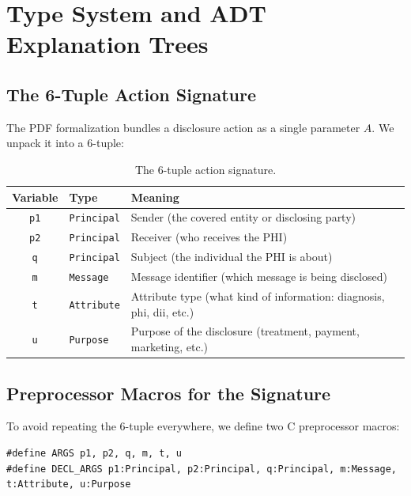 \documentclass[11pt,letterpaper]{article}
\begin{document}
\section{Type System and ADT Explanation Trees}
\label{sec:types-adt}

\subsection{The 6-Tuple Action Signature}

The PDF formalization bundles a disclosure action as a single parameter $A$. We unpack it into a 6-tuple:

\begin{table}[H]
\centering
\begin{tabular}{cll}
\toprule
\textbf{Variable} & \textbf{Type} & \textbf{Meaning} \\
\midrule
\texttt{p1} & \texttt{Principal} & Sender (the covered entity or disclosing party) \\
\texttt{p2} & \texttt{Principal} & Receiver (who receives the PHI) \\
\texttt{q}  & \texttt{Principal} & Subject (the individual the PHI is about) \\
\texttt{m}  & \texttt{Message}   & Message identifier (which message is being disclosed) \\
\texttt{t}  & \texttt{Attribute} & Attribute type (what kind of information: diagnosis, phi, dii, etc.) \\
\texttt{u}  & \texttt{Purpose}   & Purpose of the disclosure (treatment, payment, marketing, etc.) \\
\bottomrule
\end{tabular}
\caption{The 6-tuple action signature.}
\end{table}

\subsection{Preprocessor Macros for the Signature}

To avoid repeating the 6-tuple everywhere, we define two C preprocessor macros:

\begin{lstlisting}[style=soufflestyle,caption={Preprocessor macros from hipaa\_types.dl}]
#define ARGS p1, p2, q, m, t, u
#define DECL_ARGS p1:Principal, p2:Principal, q:Principal, m:Message, t:Attribute, u:Purpose
\end{lstlisting}
\end{document}
